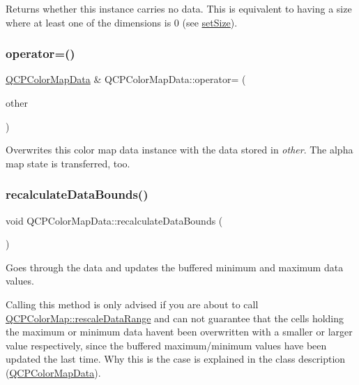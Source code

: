 Returns whether this instance carries no data. This is equivalent to having a size where at least one of the dimensions is 0 (see \hyperlink{classQCPColorMapData_a0d9ff35c299d0478b682bfbcdd9c097e}{set\+Size}). \mbox{\label{classQCPColorMapData_afdf4dd1b2f5714234fe84709b85c2a8d}} 
\subsubsection{\texorpdfstring{operator=()}{operator=()}}
{\footnotesize\ttfamily \hyperlink{classQCPColorMapData}{Q\+C\+P\+Color\+Map\+Data} \& Q\+C\+P\+Color\+Map\+Data\+::operator= (\begin{DoxyParamCaption}\item[{const \hyperlink{classQCPColorMapData}{Q\+C\+P\+Color\+Map\+Data} \&}]{other }\end{DoxyParamCaption})}

Overwrites this color map data instance with the data stored in {\itshape other}. The alpha map state is transferred, too. \mbox{\label{classQCPColorMapData_ab235ade8a4d64bd3adb26a99b3dd57ee}} 
\subsubsection{\texorpdfstring{recalculate\+Data\+Bounds()}{recalculateDataBounds()}}
{\footnotesize\ttfamily void Q\+C\+P\+Color\+Map\+Data\+::recalculate\+Data\+Bounds (\begin{DoxyParamCaption}{ }\end{DoxyParamCaption})}

Goes through the data and updates the buffered minimum and maximum data values.

Calling this method is only advised if you are about to call \hyperlink{classQCPColorMap_a856608fa3dd1cc290bcd5f29a5575774}{Q\+C\+P\+Color\+Map\+::rescale\+Data\+Range} and can not guarantee that the cells holding the maximum or minimum data haven\textquotesingle{}t been overwritten with a smaller or larger value respectively, since the buffered maximum/minimum values have been updated the last time. Why this is the case is explained in the class description (\hyperlink{classQCPColorMapData}{Q\+C\+P\+Color\+Map\+Data}).

